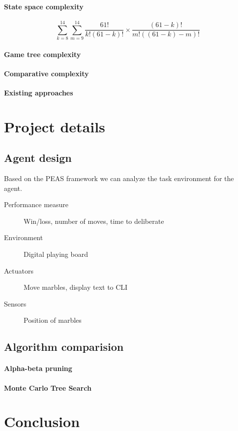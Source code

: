\documentclass{llncs}
\begin{document}
\paragraph{State space complexity}

$$
  \sum_{k=8}^{14}\sum_{m=9}^{14}\frac{61!}{k!(61-k)!}\times\frac{(61-k)!}{m!((61-k)-m)!}
$$

\paragraph{Game tree complexity}

\paragraph{Comparative complexity}

\paragraph{Existing approaches}

\section{Project details}

\subsection{Agent design}

Based on the PEAS framework we can analyze the task environment for the agent. \cite[p.107]{russell_artificial_2021}

\begin{description}
  \item[Performance measure] Win/loss, number of moves, time to deliberate
  \item[Environment] Digital playing board
  \item[Actuators] Move marbles, display text to CLI
  \item[Sensors] Position of marbles
\end{description}

\subsection{Algorithm comparision}

\paragraph{Alpha-beta pruning}

\paragraph{Monte Carlo Tree Search}

\subsection{}

\section{Conclusion}



\end{document}
